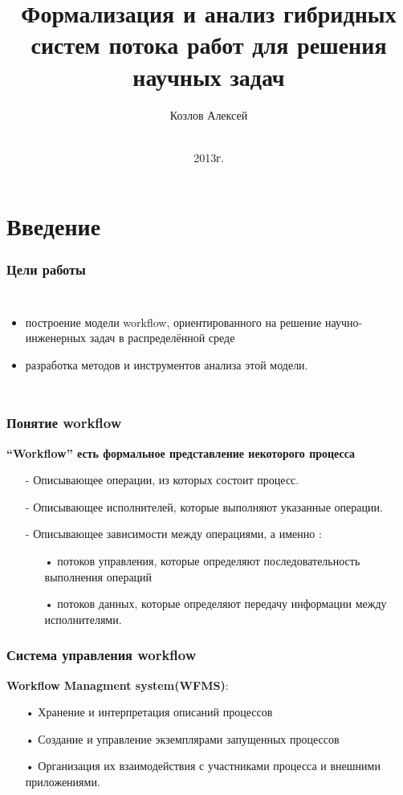 \documentclass[10pt,pdf,hyperref={unicode}]{beamer}
\title{Формализация и анализ гибридных систем потока работ  для решения 
научных задач}
\author{Козлов Алексей}
\institute{НИУ ВШЭ
}
\date{
    \\
    2013г.
}
\begin{document}
\begin{frame}
  \maketitle
\end{frame}

\section{Введение}

\begin{frame}
  \frametitle{Цели работы}
 \begin{columns}
     \begin{itemize}
        \item<1-> построение модели workflow, ориентированного  на решение научно-инженерных задач в распределённой среде 
        \item<1-> разработка методов и инструментов анализа этой модели.
    \end{itemize}      


\end{columns}
\end{frame}

\begin{frame}
  \frametitle{Понятие workflow}
    \textbf{“Workflow”  есть формальное представление  некоторого процесса}
\begin{enumerate}
\item[-] Описывающее операции, из которых состоит процесс.
\item[-] Описывающее исполнителей, которые выполняют указанные операции.
\item[-] Описывающее зависимости между операциями, а именно :
\begin{enumerate}
\item[•] потоков управления, которые определяют последовательность выполнения операций 
\item[•] потоков данных, которые
определяют передачу информации между исполнителями.
\end{enumerate}
\end{enumerate}
\end{frame}

\begin{frame}
  \frametitle{Система управления workflow}
    \textbf{ Workflow Managment system(WFMS)}:
\begin{enumerate}
\item[•] Хранение и интерпретация описаний
процессов 
\item[•] Создание и управление экземплярами запущенных процессов
\item[•] Организация их взаимодействия с участниками
процесса и внешними приложениями.
\end{enumerate}
\end{frame}
\end{document}
